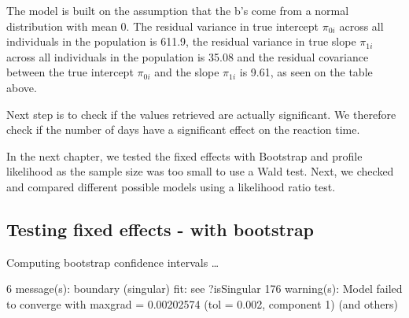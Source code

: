 \documentclass[
]{article}
\begin{document}
The model is built on the assumption that the b's come from a normal
distribution with mean 0. The residual variance in true intercept
\(\pi_{0i}\) across all individuals in the population is 611.9, the
residual variance in true slope \(\pi_{1i}\) across all individuals in
the population is 35.08 and the residual covariance between the true
intercept \(\pi_{0i}\) and the slope \(\pi_{1i}\) is 9.61, as seen on
the table above.

Next step is to check if the values retrieved are actually significant.
We therefore check if the number of days have a significant effect on
the reaction time.

In the next chapter, we tested the fixed effects with Bootstrap and
profile likelihood as the sample size was too small to use a Wald test.
Next, we checked and compared different possible models using a
likelihood ratio test.

\hypertarget{testing-fixed-effects---with-bootstrap}{%
\subsection{Testing fixed effects - with
bootstrap}\label{testing-fixed-effects---with-bootstrap}}

Computing bootstrap confidence intervals \ldots{}

6 message(s): boundary (singular) fit: see ?isSingular 176 warning(s):
Model failed to converge with max\textbar grad\textbar{} = 0.00202574
(tol = 0.002, component 1) (and others)
\end{document}
